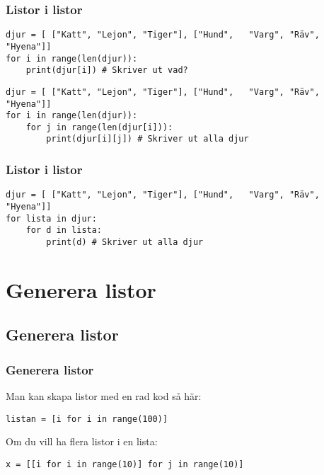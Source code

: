 \documentclass[aspectratio=169]{beamer}
\begin{document}
\begin{frame}[fragile]
	\frametitle{Listor i listor}
	
	\begin{lstlisting}
djur = [ ["Katt", "Lejon", "Tiger"], ["Hund",   "Varg", "Räv", "Hyena"]]
for i in range(len(djur)):
    print(djur[i]) # Skriver ut vad?
	\end{lstlisting}
	
	\pause
	
	\begin{lstlisting}
djur = [ ["Katt", "Lejon", "Tiger"], ["Hund",   "Varg", "Räv", "Hyena"]]
for i in range(len(djur)):
    for j in range(len(djur[i])):
        print(djur[i][j]) # Skriver ut alla djur
	\end{lstlisting}
	
\end{frame}

\begin{frame}[fragile]
	\frametitle{Listor i listor}
	
	\begin{lstlisting}
djur = [ ["Katt", "Lejon", "Tiger"], ["Hund",   "Varg", "Räv", "Hyena"]]
for lista in djur:
    for d in lista:
        print(d) # Skriver ut alla djur
	\end{lstlisting}

\end{frame}

\section{Generera listor}

\subsection{Generera listor}

\begin{frame}[fragile]
	\frametitle{Generera listor}
	
	Man kan skapa listor med en rad kod så här:
	
	\begin{lstlisting}
listan = [i for i in range(100)]
	\end{lstlisting}
	
	\pause
	
	Om du vill ha flera listor i en lista:
	
	\begin{lstlisting}
x = [[i for i in range(10)] for j in range(10)]
	\end{lstlisting}

\end{frame}
\end{document}
